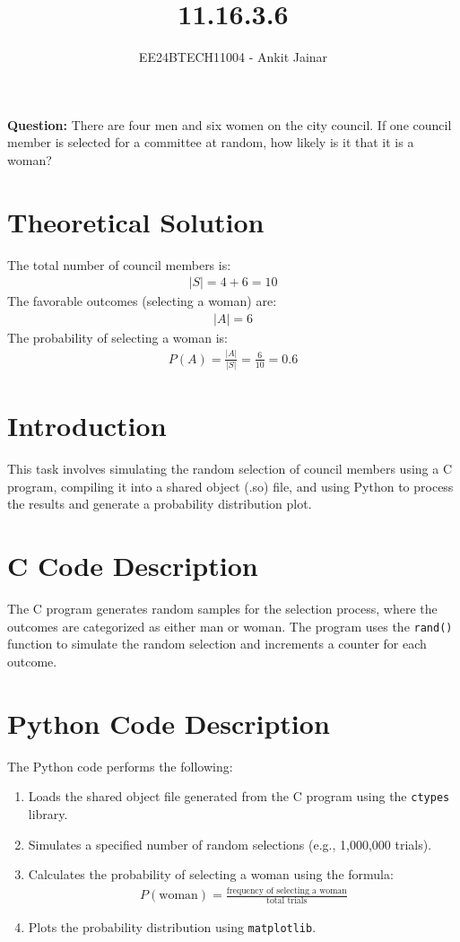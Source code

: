 \documentclass[journal]{IEEEtran}
\begin{document}
\title{11.16.3.6}
\author{EE24BTECH11004 - Ankit Jainar}
\maketitle

\textbf{Question:}
There are four men and six women on the city council. If one council member is selected for a committee at random, how likely is it that it is a woman?

\section*{Theoretical Solution}
The total number of council members is:
\begin{align}
    |S| = 4 + 6 = 10
\end{align}
The favorable outcomes (selecting a woman) are:
\begin{align}
    |A| = 6
\end{align}
The probability of selecting a woman is:
\begin{align}
    P(A) = \frac{|A|}{|S|} = \frac{6}{10} = 0.6
\end{align}

\section*{Introduction}
This task involves simulating the random selection of council members using a C program, compiling it into a shared object (.so) file, and using Python to process the results and generate a probability distribution plot.

\section*{C Code Description}
The C program generates random samples for the selection process, where the outcomes are categorized as either man or woman. The program uses the \texttt{rand()} function to simulate the random selection and increments a counter for each outcome.

\section*{Python Code Description}
The Python code performs the following:
\begin{enumerate}
    \item Loads the shared object file generated from the C program using the \texttt{ctypes} library.
    \item Simulates a specified number of random selections (e.g., 1,000,000 trials).
    \item Calculates the probability of selecting a woman using the formula:
    \begin{align}
    P(\text{woman}) = \frac{\text{frequency of selecting a woman}}{\text{total trials}}
    \end{align}
    \item Plots the probability distribution using \texttt{matplotlib}.
\end{enumerate}
\end{document}
